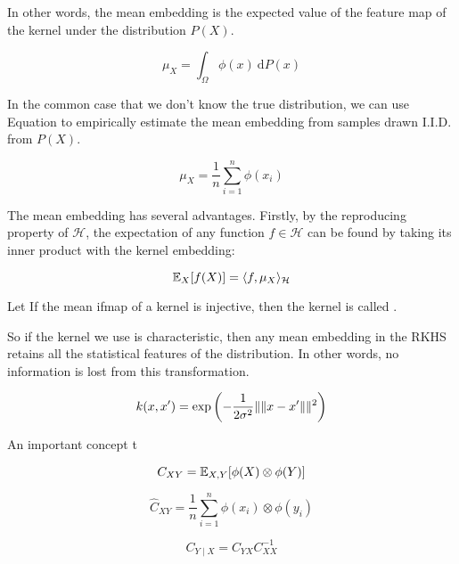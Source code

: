 In other words, the mean embedding is the expected value of the feature map of the kernel under the distribution $P(X)$.

\begin{equation}
\mu_{X} = \int_\Omega \phi(x) \ \mathrm{d}P(x)
\end{equation}

In the common case that we don't know the true distribution, we can use Equation to empirically estimate the mean embedding from samples drawn I.I.D. from $P(X)$.

\begin{equation}
\mu_{X} = \frac{1}{n} \sum_{i=1}^n \phi(x_i)
\end{equation}

The mean embedding has several advantages. Firstly, by the reproducing property of $\mathcal{H}$, the expectation of any function $f \in \mathcal{H}$ can be found by taking its inner product with the kernel embedding:

\begin{equation}
\mathbb{E}_X[f(X)] = \langle f, \mu_X\rangle_\mathcal{H}
\end{equation}

\begin{definition}
  Let If the mean ifmap of a kernel is injective, then the kernel is called .
\end{definition}

So if the kernel we use is characteristic, then any mean embedding in the RKHS retains all the statistical features of the distribution. In other words, no information is lost from this transformation.

\begin{equation}
  k(x,x') = \exp\left(-\frac{1}{2\sigma^2} \lVert\lVert x-x'\rVert\rVert^2 \right)
\end{equation}

An important concept t

\begin{equation}
  C_{XY} = \mathbb{E}_{X, Y}[\phi(X) \otimes \phi(Y)]
\end{equation}

\begin{equation}
	\widehat{C}_{XY} = \frac{1}{n} \sum_{i=1}^n \phi(x_i) \otimes \phi(y_i)
\end{equation}

\begin{equation}
	C_{Y \mid X} = C_{YX} C_{XX}^{-1}
\end{equation}
